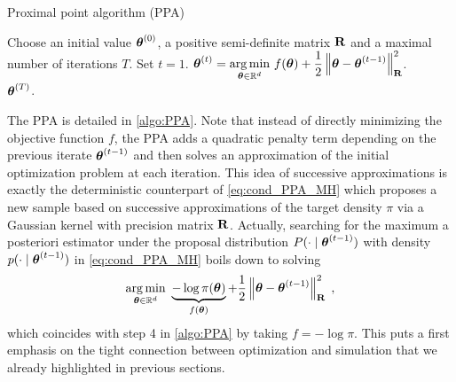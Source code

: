 \documentclass[nohypdvips,onefignum,onetabnum]{siamart171218}
\begin{document}
%
\begin{algorithm}
\caption{Proximal point algorithm (PPA)}
\label{algo:PPA}
\begin{algorithmic}[1]
\State Choose an initial value $\boldsymbol{\theta}^{(0)}$, a positive semi-definite matrix $\mathbf{R}$ and a maximal number of iterations $T$.
\State Set $t=1$.
\State $\boldsymbol{\theta}^{(t)} = \underset{\boldsymbol{\theta}\in\mathbb{R}^d}{\arg \min}\ f(\boldsymbol{\theta}) + \dfrac{1}{2}\left\|\boldsymbol{\theta}-\boldsymbol{\theta}^{(t-1)}\right\|_{\mathbf{R}}^2$.
\EndWhile\\
\Return $\boldsymbol{\theta}^{(T)}$.
\end{algorithmic}
\end{algorithm}
%

The PPA is detailed in \cref{algo:PPA}.
Note that instead of directly minimizing the objective function $f$, the PPA adds a quadratic penalty term depending on the previous iterate $\boldsymbol{\theta}^{(t-1)}$ and then solves an approximation of the initial optimization problem at each iteration.
This idea of successive approximations is exactly the deterministic counterpart of \cref{eq:cond_PPA_MH} which proposes a new sample based on successive approximations of the target density $\pi$ via a Gaussian kernel with precision matrix $\mathbf{R}$.
Actually, searching for the maximum a posteriori estimator under the proposal distribution $P(\cdot \mid \boldsymbol{\theta}^{(t-1)})$ with density $p(\cdot \mid \boldsymbol{\theta}^{(t-1)})$ in \cref{eq:cond_PPA_MH} boils down to solving 
\begin{equation}
  \underset{\Bs{\theta}\in\mathbb{R}^d}{\arg \min}\ \underbrace{-\log\pi(\Bs{\theta})}_{f(\Bs{\theta})} + \dfrac{1}{2}\nr{\Bs{\theta}-\Bs{\theta}^{(t-1)}}_{\B{R}}^2\eqsp,
\end{equation} 
which coincides with step 4 in \cref{algo:PPA} by taking $f = -\log \pi$.
This puts a first emphasis on the tight connection between optimization and simulation that we already highlighted in previous sections.\\
\end{document}
